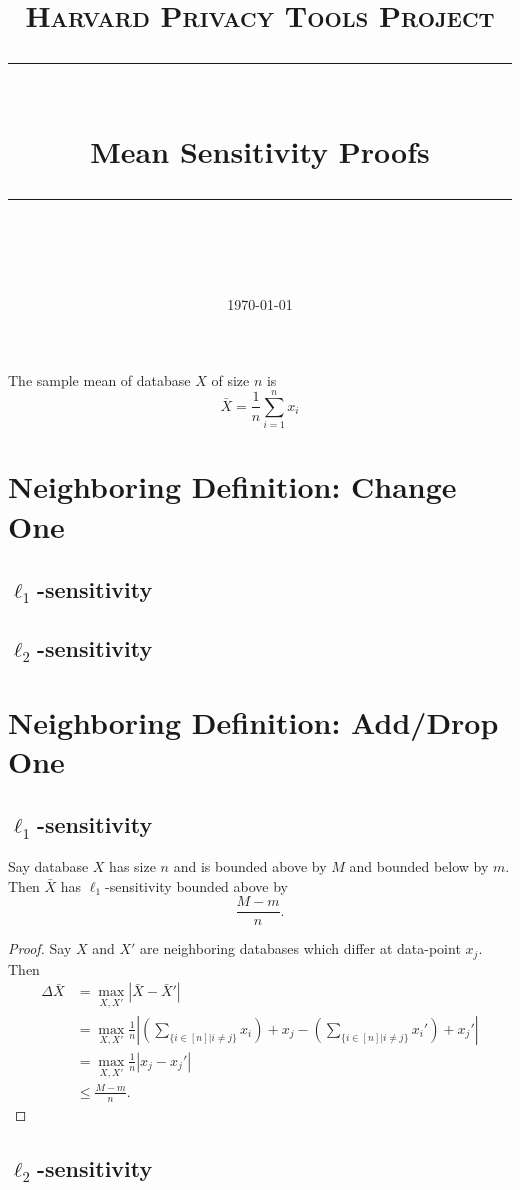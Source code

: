 \documentclass[11pt]{scrartcl} %
\title{
	\normalfont\normalsize
	\textsc{Harvard Privacy Tools Project}\\ %
	\vspace{25pt} %
	\rule{\linewidth}{0.5pt}\\ %
	\vspace{20pt} %
	{\huge Mean Sensitivity Proofs}\\ %
	\vspace{12pt} %
	\rule{\linewidth}{2pt}\\ %
	\vspace{12pt} %
}
\date{\normalsize\today} %
\begin{document}
\maketitle 

\begin{definition}
The sample mean of database $X$ of size $n$ is 
$$\bar{X} = \frac{1}{n} \sum_{i=1}^n x_i $$
\end{definition}

\section{Neighboring Definition: Change One}
\subsection{$\ell_1$-sensitivity}
\subsection{$\ell_2$-sensitivity}

\section{Neighboring Definition: Add/Drop One}
\subsection{$\ell_1$-sensitivity}

\begin{theorem}
Say database $X$ has size $n$ and is bounded above by $M$ and bounded below by $m$. Then $\bar{X}$ has $\ell_1$-sensitivity bounded above by 
$$ \frac{M-m}{n}.$$
\end{theorem}

\begin{proof}
Say $X$ and $X'$ are neighboring databases which differ at data-point $x_j$. Then
\begin{align*}
\Delta{\bar{X}} &= \max_{X,X'} \left\vert \bar{X} - \bar{X}' \right\vert \\
	&=  \max_{X,X'} \frac{1}{n} \left\vert \left(\sum_{\{ i \in [n] \vert i \ne j\}} x_i\right) + x_j  - \left(\sum_{\{ i \in [n] \vert i \ne j\}} x_i'\right) + x_j'  \right\vert \\
	&= \max_{X,X'} \frac{1}{n} \left\vert x_j - x_j' \right\vert \\
	&\le \frac{M-m}{n}.
\end{align*}
\end{proof}

\subsection{$\ell_2$-sensitivity}



\end{document}
